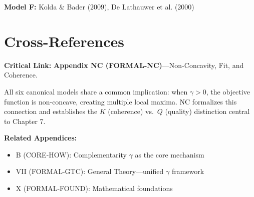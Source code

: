 \textbf{Model F:} Kolda \& Bader (2009), De Lathauwer et al. (2000)

\section{Cross-References}
\label{sec:mdl-crossref}

\begin{tcolorbox}[colback=gray!5!white, colframe=gray!50!black]
\textbf{Critical Link:} \textbf{Appendix NC (FORMAL-NC)}---Non-Concavity, Fit, and Coherence.

All six canonical models share a common implication: when $\gamma > 0$, the objective function is non-concave, creating multiple local maxima. NC formalizes this connection and establishes the $K$ (coherence) vs.\ $Q$ (quality) distinction central to Chapter 7.

\textbf{Related Appendices:}
\begin{itemize}[nosep]
\item B (CORE-HOW): Complementarity $\gamma$ as the core mechanism
\item VII (FORMAL-GTC): General Theory---unified $\gamma$ framework
\item X (FORMAL-FOUND): Mathematical foundations
\end{itemize}
\end{tcolorbox}


